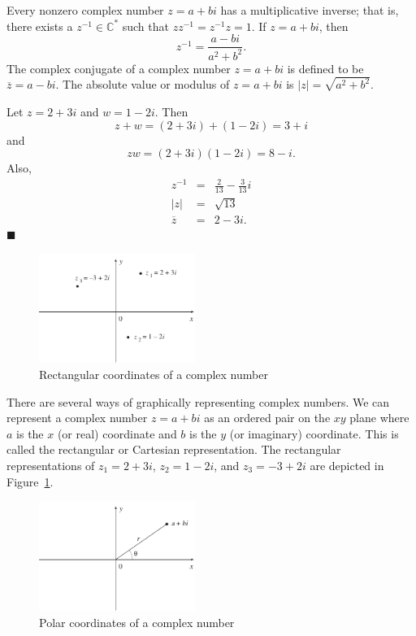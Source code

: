  
Every nonzero complex number $z = a +bi$ has a multiplicative inverse;
that is, there exists a $z^{-1} \in {\mathbb C}^\ast$ such that $z z^{-1}
= z^{-1} z = 1$. If $z = a + bi$, then 
$$
z^{-1} = \frac{a-bi}{ a^2 + b^2  }.
$$
The {\bfi complex conjugate} of a complex
number $z = a +bi$ is defined to be $\overline{z} = a-bi$.  The {\bfi
absolute value} or {\bfi modulus} of  $z = a +bi$  is $|z| =
\sqrt{a^2+b^2}$.  
 
 
\vspace{ 2ex }
 
 
Let $z = 2 + 3i$ and $w = 1-2i$. Then
$$
z + w = (2 + 3i)+( 1-2i ) = 3 +i
$$
and
$$
z  w = (2 + 3i)( 1-2i ) = 8-i.
$$
Also,
\begin{eqnarray*}
z^{-1} & = & \frac{2}{13} - \frac{3}{13}i \\
|z| & = & \sqrt{13} \\
\overline{z} & = & 2-3i.
\end{eqnarray*}
\hspace{\fill} $\blacksquare$
 
\vspace{ 2ex }
 
\begin{figure}[hbt]
\begin{center}
\centerline {
\includegraphics[width=2in]{rectcoord}
}
\end{center}
\caption{Rectangular coordinates of a complex number}
\label{rectcoord}
\end{figure}
 
 
There are several ways of graphically representing complex numbers. We
can represent a complex number $z = a +bi$ as an ordered pair on the
$xy$ plane where $a$ is the $x$ (or real) coordinate and $b$ is the $y$
(or imaginary) coordinate. This is called the {\bfi rectangular} or
{\bfi Cartesian} representation. The rectangular representations of
$z_1 = 2 + 3i$, $z_2 = 1 - 2i$, and $z_3 = - 3 + 2i$ are depicted in
Figure~\ref{rectcoord}.
 
 
\begin{figure}[htb]
\begin{center}
\centerline {
\includegraphics[width=2in]{polarcoord}
}
\end{center}
\caption{Polar coordinates of a complex number}
\label{polarcoord}
\end{figure}
 
